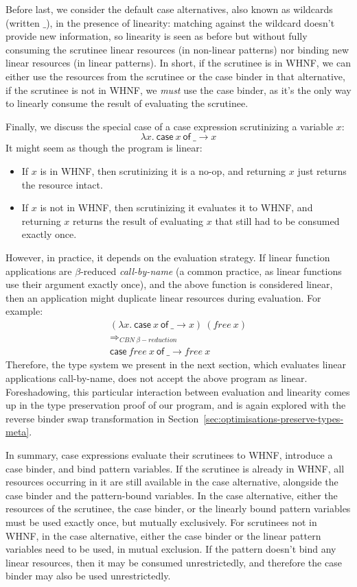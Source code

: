 \documentclass[acmsmall, screen, review]{acmart}
\newcommand{\parawith}[1]{\paragraph{\emph{#1}}}
\newcommand{\ccase}[2]{\mathsf{case}~#1~\mathsf{of}~#2}
\begin{document}
Before last, we consider the default case alternatives, also known as wildcards
(written $\_$), in the presence of linearity: matching against the wildcard
doesn't provide new information, so linearity is seen as before but without
fully consuming the scrutinee linear resources (in non-linear patterns) nor
binding new linear resources (in linear patterns). In short, if the scrutinee
is in WHNF, we can either use the resources from the scrutinee or the case
binder in that alternative, if the scrutinee is not in WHNF, we \emph{must} use
the case binder, as it's the only way to linearly consume the result of
evaluating the scrutinee.

Finally, we discuss the special case of a case expression scrutinizing a
variable $x$:
\[
\lambda x.~\ccase{x}{\_ \to x}
\]
It might seem as though the program is linear:
\begin{itemize}
\item If $x$ is in WHNF, then scrutinizing it is a no-op, and returning $x$
just returns the resource intact.
\item If $x$ is not in WHNF, then scrutinizing it evaluates it to WHNF, and
returning $x$ returns the result of evaluating $x$ that still had to be
consumed exactly once.
\end{itemize}
However, in practice, it depends on the evaluation strategy. If linear function
applications are $\beta$-reduced \emph{call-by-name} (a common practice, as
linear functions use their argument exactly once), and the above function is
considered linear, then an application might duplicate linear resources during
evaluation. For example:
\[
\begin{array}{l}
(\lambda x.~\ccase{x}{\_ \to x})~(free~x)\\
\Longrightarrow_{CBN~\beta-reduction}\\
\ccase{free~x}{\_ \to free~x}
\end{array}
\]
Therefore, the type system we present in the next section, which evaluates
linear applications call-by-name, does not accept the above program as linear.
Foreshadowing, this particular interaction between evaluation and linearity
comes up in the type preservation proof of our program, and is again explored
with the reverse binder swap transformation in
Section~\ref{sec:optimisations-preserve-types-meta}.

In summary, case expressions evaluate their scrutinees to WHNF,
introduce a case binder, and bind pattern variables. If the scrutinee is
already in WHNF, all resources occurring in it are still available in the case
alternative, alongside the case binder and the pattern-bound variables. In the
case alternative, either the resources of the scrutinee, the case binder, or
the linearly bound pattern variables must be used exactly once, but mutually
exclusively. For scrutinees not in WHNF, in the case alternative, either the
case binder or the linear pattern variables need to be used, in mutual exclusion.
If the pattern doesn't bind any linear resources, then it may be consumed
unrestrictedly, and therefore the case binder may also be used unrestrictedly.
\end{document}
